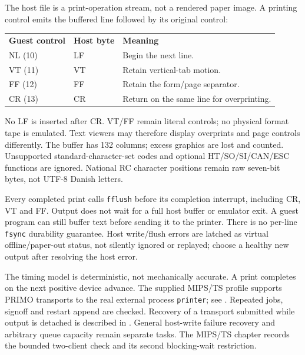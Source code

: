 The host file is a print-operation stream, not a rendered paper image. A
printing control emits the buffered line followed by its original control:

\begin{center}
\begin{tabular}{lll}
\textbf{Guest control} & \textbf{Host byte} & \textbf{Meaning} \\
NL (10) & LF & Begin the next line. \\
VT (11) & VT & Retain vertical-tab motion. \\
FF (12) & FF & Retain the form/page separator. \\
CR (13) & CR & Return on the same line for overprinting. \\
\end{tabular}
\end{center}

No LF is inserted after CR. VT/FF remain literal controls; no physical
format tape is emulated. Text viewers may therefore display overprints and
page controls differently. The buffer has 132 columns; excess graphics are
lost and counted. Unsupported standard-character-set codes and optional
HT/SO/SI/CAN/ESC functions are ignored. National RC character positions remain
raw seven-bit bytes, not UTF-8 Danish letters.

Every completed print calls \texttt{fflush} before its completion interrupt,
including CR, VT and FF. Output does not wait for a full host buffer or emulator
exit. A guest program can still buffer text before sending it to the printer.
There is no per-line \texttt{fsync} durability guarantee. Host write/flush errors
are latched as virtual offline/paper-out status, not silently ignored or
replayed; choose a healthy new output after resolving the host error.

The timing model is deterministic, not mechanically accurate. A print completes
on the next positive device advance. The supplied MIPS/TS profile supports
PRIMO transports to the real external process \texttt{printer}; see
. Repeated jobs,
signoff and restart append are checked. Recovery of a transport submitted while
output is detached is described in
.
General host-write failure recovery and arbitrary queue capacity remain separate
tasks. The MIPS/TS chapter records the bounded two-client check and its second
blocking-wait restriction.
